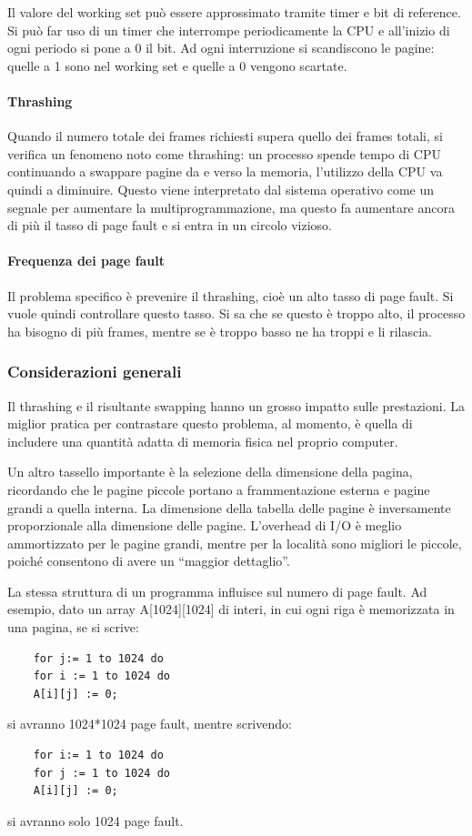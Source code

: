 \documentclass[a4paper]{article}
\begin{document}
Il valore del working set può essere approssimato tramite timer e bit di reference. Si può far uso di un timer che interrompe periodicamente la CPU e all'inizio di ogni periodo si pone a 0 il bit. Ad ogni interruzione si scandiscono le pagine: quelle a 1 sono nel working set e quelle a 0 vengono scartate.

\paragraph{Thrashing} Quando il numero totale dei frames richiesti supera quello dei frames totali, si verifica un fenomeno noto come thrashing: un processo spende tempo di CPU continuando a swappare pagine da e verso la memoria, l'utilizzo della CPU va quindi a diminuire. Questo viene interpretato dal sistema operativo come un segnale per aumentare la multiprogrammazione, ma questo fa aumentare ancora di più il tasso di page fault e si entra in un circolo vizioso.

\paragraph{Frequenza dei page fault}
Il problema specifico è prevenire il thrashing, cioè un alto tasso di page fault. Si vuole quindi controllare questo tasso. Si sa che se questo è troppo alto, il processo ha bisogno di più frames, mentre se è troppo basso ne ha troppi e li rilascia.

\subsubsection{Considerazioni generali}
Il thrashing e il risultante swapping hanno un grosso impatto sulle prestazioni. La miglior pratica per contrastare questo problema, al momento, è quella di includere una quantità adatta di memoria fisica nel proprio computer.

Un altro tassello importante è la selezione della dimensione della pagina, ricordando che le pagine piccole portano a frammentazione esterna e pagine grandi a quella interna. La dimensione della tabella delle pagine è inversamente proporzionale alla dimensione delle pagine. L'overhead di I/O è meglio ammortizzato per le pagine grandi, mentre per la località sono migliori le piccole, poiché consentono di avere un ``maggior dettaglio''.

La stessa struttura di un programma influisce sul numero di page fault. Ad esempio, dato un array A[1024][1024] di interi, in cui ogni riga è memorizzata in una pagina, se si scrive:
\begin{Verbatim}
    for j:= 1 to 1024 do
    for i := 1 to 1024 do
    A[i][j] := 0;
\end{Verbatim}
si avranno 1024*1024 page fault, mentre scrivendo:
\begin{Verbatim}
    for i:= 1 to 1024 do
    for j := 1 to 1024 do
    A[i][j] := 0;
\end{Verbatim}
si avranno solo 1024 page fault.
\end{document}
